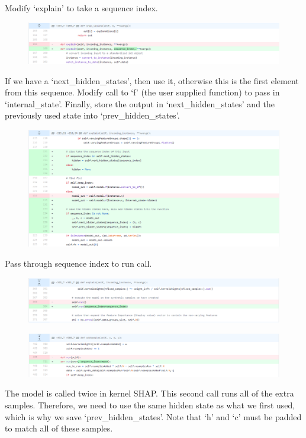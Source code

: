 \documentclass[12pt]{article}
\begin{document}
Modify `explain' to take a sequence index.
\begin{figure}[H]
\includegraphics[scale=0.4]{diff/diff_5.png}
\end{figure}
If we have a `next\_hidden\_states', then use it, otherwise this is the first element from this sequence. Modify call to `f' (the user supplied function) to pass in `internal\_state'. Finally, store the output in `next\_hidden\_states' and the previously used state into  `prev\_hidden\_states'.
\begin{figure}[H]
\includegraphics[scale=0.4]{diff/diff_6.png}
\end{figure}
Pass through sequence index to run call.
\begin{figure}[H]
\includegraphics[scale=0.4]{diff/diff_7.png}
\end{figure}
\begin{figure}[H]
\includegraphics[scale=0.4]{diff/diff_8.png}
\end{figure}
The model is called twice in kernel SHAP. This second call runs all of the extra samples. Therefore, we need to use the same hidden state as what we first used, which is why we save `prev\_hidden\_states'. Note that `h' and `c' must be padded to match all of these samples.
\end{document}
